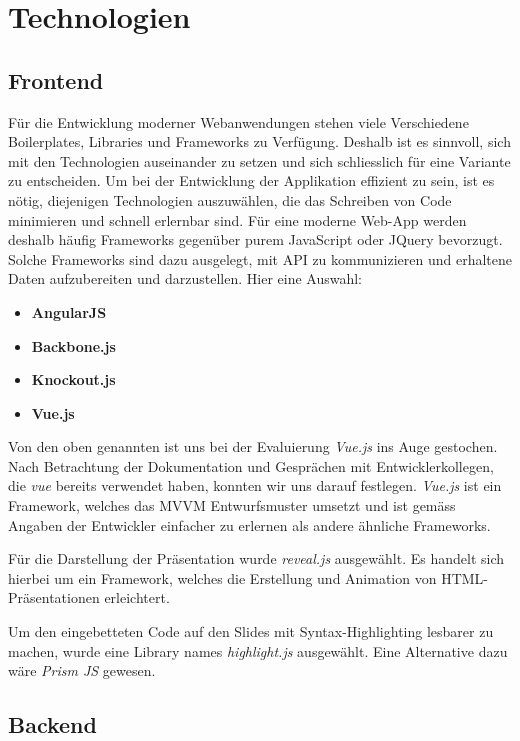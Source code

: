 \chapter{Technologien}
\label{chap:techstack}

\section{Frontend}
Für die Entwicklung moderner Webanwendungen stehen viele Verschiedene Boilerplates, Libraries und Frameworks zu Verfügung. Deshalb ist es sinnvoll, sich mit den Technologien auseinander zu setzen und sich schliesslich für eine Variante zu entscheiden. Um bei der Entwicklung der Applikation effizient zu sein, ist es nötig, diejenigen Technologien auszuwählen, die das Schreiben von Code minimieren und schnell erlernbar sind. Für eine moderne Web-App werden deshalb häufig Frameworks gegenüber purem JavaScript oder JQuery bevorzugt. Solche Frameworks sind dazu ausgelegt, mit API zu kommunizieren und erhaltene Daten aufzubereiten und darzustellen. Hier eine Auswahl:

\begin{itemize}
	\item \textbf{AngularJS}
	\item \textbf{Backbone.js}
	\item \textbf{Knockout.js}
	\item \textbf{Vue.js}
\end{itemize}

Von den oben genannten ist uns bei der Evaluierung \emph{Vue.js} ins Auge gestochen. Nach Betrachtung der Dokumentation und Gesprächen mit Entwicklerkollegen, die \emph{vue} bereits verwendet haben, konnten wir uns darauf festlegen. \emph{Vue.js} ist ein Framework, welches das MVVM Entwurfsmuster umsetzt und ist gemäss Angaben der Entwickler einfacher zu erlernen als andere ähnliche Frameworks.

Für die Darstellung der Präsentation wurde \emph{reveal.js} ausgewählt. Es handelt sich hierbei um ein Framework, welches die Erstellung und Animation von HTML-Präsentationen erleichtert. 

Um den eingebetteten Code auf den Slides mit Syntax-Highlighting lesbarer zu machen, wurde eine Library names \emph{highlight.js} ausgewählt. Eine Alternative dazu wäre \emph{Prism JS} gewesen. 


\section{Backend}

